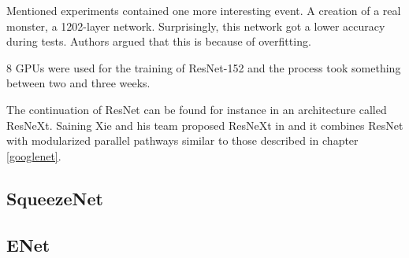 Mentioned experiments contained one more interesting event. A creation of a real monster, a 1202-layer network. Surprisingly, this network got a lower accuracy during tests. Authors argued that this is because of overfitting.

8 GPUs were used for the training of ResNet-152 and the process took something between two and three weeks.

The continuation of ResNet can be found for instance in an architecture called ResNeXt. Saining Xie and his team proposed ResNeXt in \cite{resnext} and it combines ResNet with modularized parallel pathways similar to those described in chapter \ref{googlenet}.

\subsection{SqueezeNet}
\label{squeezenet}

\subsection{ENet}
\label{enet}